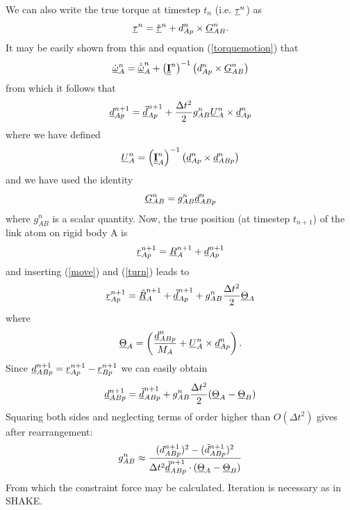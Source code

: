 We can also write the true torque at timestep $t_n$ (i.e. $\mbox{$\underline{\tau}$}^{n}$) as
\begin{equation}
\mbox{$\underline{\tau}$}^{n}=\mbox{$\underline{\tilde{\tau}}$}^n+d_{Ap}^{n}\times\mbox{$\underline{G}$}_{AB}^{n}.
\end{equation}
It may be easily shown from this and equation (\ref{torquemotion}) that
\begin{equation}
\mbox{$\underline{\dot{\omega}}$}_{A}^{n}=\mbox{$\underline{\dot{\tilde{\omega}}}$}_{A}^{n}+
\left(\mbox{$\underline{\underline{\bf I}}$}^{n}\right)^{-1}\left(d_{Ap}^{n}\times\mbox{$\underline{G}$}_{AB}^{n}\right)
\end{equation}
from which it follows that
\begin{equation}
\mbox{$\underline{d}$}_{Ap}^{n+1}=\mbox{$\underline{\tilde{d}}$}_{Ap}^{n+1}+{\Delta t^2 \over 2}g_{AB}^{n}
\mbox{$\underline{U}$}_{A}^{n}\times\mbox{$\underline{d}$}_{Ap}^{n} \label{turn}
\end{equation}
where we have defined
\begin{equation}
\mbox{$\underline{U}$}_{A}^{n}=\left(\mbox{$\underline{\underline{\bf I}}$}_{A}^{n}\right)^{-1}
\left( \mbox{$\underline{d}$}_{Ap}^{n}\times \mbox{$\underline{d}$}_{ABp}^{n}\right)
\end{equation}
and we have used the identity
\[\mbox{$\underline{G}$}_{AB}^{n}=g_{AB}^{n}\mbox{$\underline{d}$}_{ABp}^{n}\]
where $g_{AB}^{n}$ is a scalar quantity.
Now, the true position (at timestep $t_{n+1}$)  of the link atom on rigid body A is
\begin{equation}
\mbox{$\underline{r}$}_{Ap}^{n+1}=\mbox{$\underline{R}$}_{A}^{n+1}+\mbox{$\underline{d}$}_{Ap}^{n+1}
\end{equation}
and inserting (\ref{move}) and (\ref{turn}) leads to
\begin{equation}
\mbox{$\underline{r}$}_{Ap}^{n+1}=\mbox{$\underline{\tilde{R}}$}_{A}^{n+1}+\mbox{$\underline{\tilde{d}}$}_{Ap}^{n+1}+
g_{AB}^{n}{\Delta t^2 \over 2}\mbox{$\underline{\Theta}$}_{A}
\end{equation}
where
\begin{equation}
\mbox{$\underline{\Theta}$}_{A}=\left({\mbox{$\underline{d}$}_{ABp}^{n} \over M_{A}}+
\mbox{$\underline{U}$}_{A}^{n}\times\mbox{$\underline{d}$}_{Ap}^{n}\right).
\end{equation}
Since $\mbox{$\underline{d}$}_{ABp}^{n+1}=\mbox{$\underline{r}$}_{Ap}^{n+1}-\mbox{$\underline{r}$}_{Bp}^{n+1}$ we
can easily obtain
\begin{equation}
\mbox{$\underline{d}$}_{ABp}^{n+1}=\mbox{$\underline{\tilde{d}}$}_{ABp}^{n+1}+
g_{AB}^{n}{\Delta t^2 \over 2}(\mbox{$\underline{\Theta}$}_{A}-\mbox{$\underline{\Theta}$}_{B})
\end{equation}
Squaring both sides and neglecting terms of order higher than
$O(\Delta t^2)$ gives after rearrangement:
\begin{equation}
g_{AB}^{n}\approx{(d_{ABp}^{n+1})^2-(\tilde{d}_{ABp}^{n+1})^2 \over
\Delta t^2 \mbox{$\underline{\tilde{d}}$}_{ABp}^{n+1}\cdot
(\mbox{$\underline{\Theta}$}_{A}-\mbox{$\underline{\Theta}$}_{B})}
\end{equation}
From which the constraint force may be calculated. Iteration is
necessary as in SHAKE.

